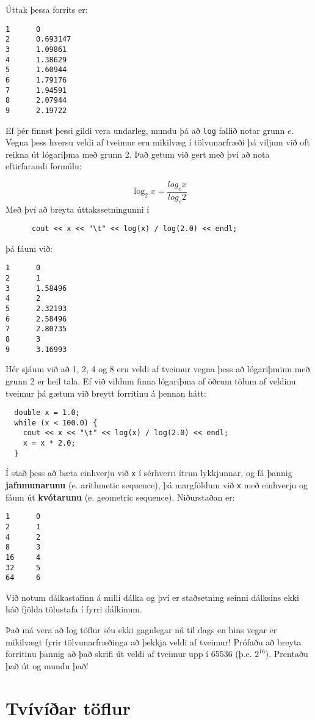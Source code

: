 Úttak þessa forrits er:

\begin{verbatim}
1      0
2      0.693147
3      1.09861
4      1.38629
5      1.60944
6      1.79176
7      1.94591
8      2.07944
9      2.19722
\end{verbatim}
%
Ef þér finnst þessi gildi vera undarleg, mundu þá að {\tt log} fallið notar grunn $e$.
Vegna þess hversu veldi af tveimur eru mikilvæg í tölvunarfræði þá viljum við oft reikna út lógariþma með grunn 2.
Það getum við gert með því að nota eftirfarandi formúlu:

\[ \log_2 x = \frac {log_e x}{log_e 2} \]
%
Með því að breyta úttakssetningunni í 

\begin{verbatim}
      cout << x << "\t" << log(x) / log(2.0) << endl;
\end{verbatim}
%
þá fáum við:

\begin{verbatim}
1      0
2      1
3      1.58496
4      2
5      2.32193
6      2.58496
7      2.80735
8      3
9      3.16993
\end{verbatim}
%
Hér sjáum við að 1, 2, 4 og 8 eru veldi af tveimur vegna þess að lógariþminn með grunn 2 er heil tala.
Ef við vildum finna lógariþma af öðrum tölum af veldinu tveimur þá gætum við breytt forritinu á þennan hátt:

\begin{verbatim}
  double x = 1.0;
  while (x < 100.0) {
    cout << x << "\t" << log(x) / log(2.0) << endl;
    x = x * 2.0;
  }
\end{verbatim}
%
Í stað þess að bæta einhverju við {\tt x} í sérhverri ítrun lykkjunnar, og fá þannig {\bf jafnmunarunu} (e. arithmetic sequence),
þá margföldum við {\tt x} með einhverju og fáum út {\bf kvótarunu} (e. geometric sequence).
Niðurstaðan er:

\begin{verbatim}
1      0
2      1
4      2
8      3
16     4
32     5
64     6
\end{verbatim}
%
Við notum dálkastafinn á milli dálka og því er staðsetning seinni dálksins ekki háð fjölda tölustafa í fyrri dálkinum.

Það má vera að log töflur séu ekki gagnlegar nú til dags en hins vegar er mikilvægt fyrir tölvunarfræðinga að þekkja veldi af tveimur!
Prófaðu að breyta forritinu þannig að það skrifi út veldi af tveimur upp í 65536 (þ.e. $2^{16}$).
Prentaðu það út og mundu það!


\section{Tvívíðar töflur}

